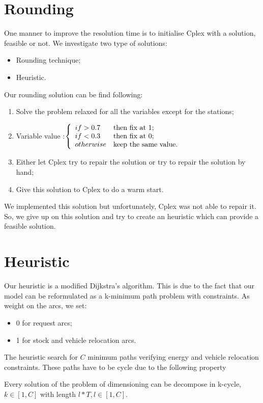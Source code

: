 \begin{bibunit}[ieeetr]
\section{Rounding}
One manner to improve the resolution time is to initialise Cplex with a solution, feasible or not.
We investigate two type of solutions:
\begin{itemize}
\item Rounding technique;
\item Heuristic.
\end{itemize}
Our rounding solution can be find following:

\begin{enumerate}
\item Solve the problem relaxed for all the variables except for the stations;
\item Variable value :$\left\{
\begin{array}{l l}
if > 0.7 & \text{then fix at 1;} \\
if < 0.3 & \text{then fix at 0;} \\
otherwise & \text{keep the same value.}
\end{array}
\right.$
\item Either let Cplex try to repair the solution or try to repair the solution by hand;
\item Give this solution to Cplex to do a warm start.
\end{enumerate}

We implemented this solution but unfortunately, Cplex was not able to repair it.
So, we give up on this solution and try to create an heuristic which can provide a feasible solution.

\section{Heuristic}
Our heuristic is a modified Dijkstra's algorithm.
This is due to the fact that our model can be reformulated as a k-minimum path problem with constraints.
As weight on the arcs, we set: 
\begin{itemize}
\item 0 for request arcs;
\item 1 for stock and vehicle relocation arcs.
\end{itemize}
The heuristic search for $C$ minimum paths verifying energy and vehicle relocation constraints.
These paths have to be cycle due to the following property 
\begin{prop}
Every solution of the problem of dimensioning can be decompose in k-cycle, $k \in [1,C]$ with length $l*T, l\in [1,C]$.
\end{prop}


\end{bibunit}
